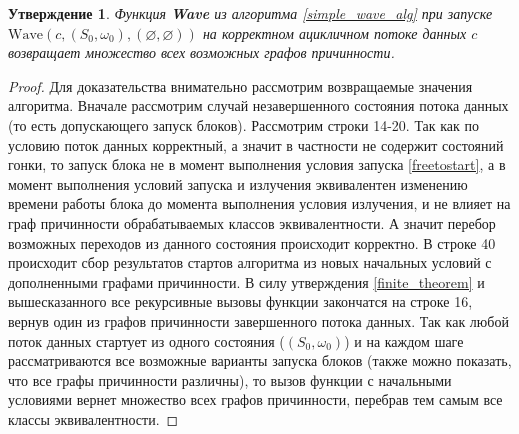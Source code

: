 \documentclass[10pt,a4paper]{article}
\newtheorem{theorem}{Утверждение}
\begin{document}
  \begin{theorem}
    Функция \textbf{Wave} из алгоритма \ref{simple_wave_alg} при запуске $\text{Wave}(c, (S_0, \omega_0), (\varnothing, \varnothing))$ на корректном
    ацикличном потоке данных $c$ возвращает множество всех возможных графов причинности.
  \end{theorem}
  \begin{proof}
    Для доказательства внимательно рассмотрим возвращаемые значения алгоритма. Вначале рассмотрим случай незавершенного состояния
    потока данных (то есть допускающего запуск блоков).
    Рассмотрим строки 14-20. Так как по условию поток данных корректный, а значит в частности не содержит состояний гонки, то запуск блока не в момент
    выполнения условия запуска \ref{freetostart}, а в момент выполнения условий запуска и излучения эквивалентен изменению времени работы блока до момента
    выполнения условия излучения, и не влияет на граф причинности обрабатываемых классов эквивалентности. А значит перебор возможных переходов из данного состояния
    происходит корректно.
    В строке 40 происходит сбор результатов стартов алгоритма из новых начальных условий с дополненными графами причинности.
    В силу утверждения \ref{finite_theorem} и вышесказанного все рекурсивные вызовы функции закончатся на строке 16, вернув один из графов причинности
    завершенного потока данных.
    Так как любой поток данных стартует из одного состояния ($(S_0, \omega_0)$) и на каждом шаге рассматриваются все возможные варианты запуска блоков
    (также можно показать, что все графы причинности различны), то вызов функции с начальными условиями вернет множество всех графов причинности, перебрав
    тем самым все классы эквивалентности.
  \end{proof}
  
\end{document}
